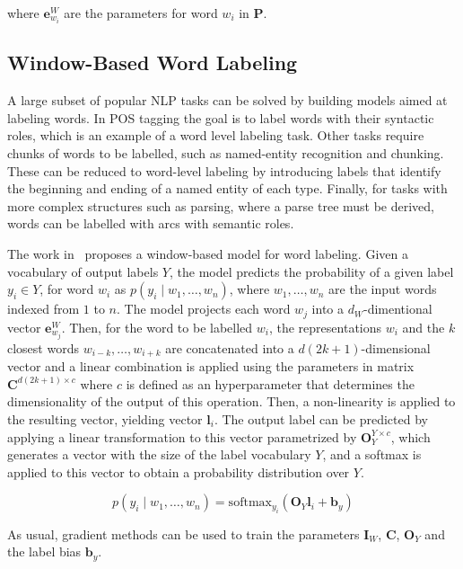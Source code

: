 \documentclass[11pt]{article}
\begin{document}
\begin{CJK*}{UTF8}{gbsn}
{where $\mathbf{e}^{W}_{w_i}$ are the parameters for word $w_i$ in $\mathbf{P}$. 


\subsection{Window-Based Word Labeling}
\label{windowmodel}

A large subset of popular NLP tasks can be solved by building models aimed at labeling words. In POS tagging the goal is to label words with their syntactic roles, which is an example of a word level labeling task. Other tasks require chunks of words to be labelled, such as named-entity recognition and chunking. These can be reduced to word-level labeling by introducing labels that identify the beginning and ending of a named entity of each type. Finally, for tasks with more complex structures such as parsing, where a parse tree must be derived, words can be labelled with arcs with semantic roles.

The work in~\cite{collobert2011natural} proposes a window-based model for word labeling. Given a vocabulary of output labels $Y$, the model predicts the probability of a given label $y_i\in Y$, for word $w_i$ as $p(y_i \mid w_1,\ldots,w_n)$, where $w_1,\ldots,w_n$ are the input words indexed from $1$ to $n$. The model projects each word $w_j$ into a $d_{W}$-dimentional vector $\mathbf{e}^W_{w_j}$. Then, for the word to be labelled $w_i$, the representations $w_i$ and the $k$ closest words $w_{i-k},\ldots,w_{i+k}$ are concatenated into a $d(2k+1)$-dimensional vector and a linear combination is applied using the parameters in matrix $\mathbf{C}^{d(2k+1)\times c}$ where $c$ is defined as an hyperparameter that determines the dimensionality of the output of this operation. Then, a non-linearity is applied to the resulting vector, yielding vector $\mathbf{l}_i$. The output label can be predicted by applying a linear transformation to this vector parametrized by $\mathbf{O}_{Y}^{Y \times c}$, which generates a vector with the size of the label vocabulary $Y$, and a softmax is applied to this vector to obtain a probability distribution over $Y$. 

\begin{equation}
\label{softmaxlabel}
p(y_i \mid w_1,\ldots ,w_n) = \mathrm{softmax}_{y_i}(\mathbf{O}_{Y} \mathbf{l}_i + \mathbf{b}_{y})
\end{equation}

As usual, gradient methods can be used to train the parameters $\mathbf{I}_{W}$, $\mathbf{C}$, $\mathbf{O}_{Y}$ and the label bias $\mathbf{b}_y$. 

}
\end{CJK*}
\end{document}
